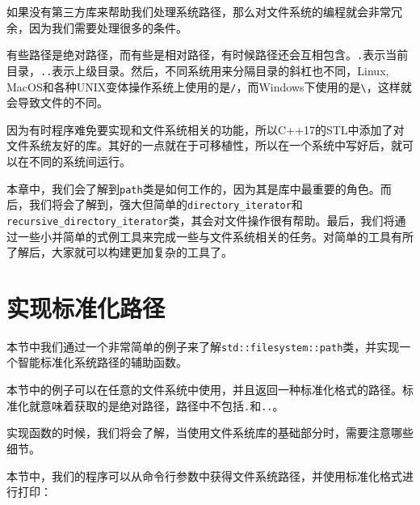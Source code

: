 如果没有第三方库来帮助我们处理系统路径，那么对文件系统的编程就会非常冗余，因为我们需要处理很多的条件。

有些路径是绝对路径，而有些是相对路径，有时候路径还会互相包含。\texttt{.}表示当前目录，\texttt{..}表示上级目录。然后，不同系统用来分隔目录的斜杠也不同，Linux, MacOS和各种UNIX变体操作系统上使用的是\texttt{/}，而Windows下使用的是\texttt{\textbackslash{}}，这样就会导致文件的不同。

因为有时程序难免要实现和文件系统相关的功能，所以C++17的STL中添加了对文件系统友好的库。其好的一点就在于可移植性，所以在一个系统中写好后，就可以在不同的系统间运行。

本章中，我们会了解到\texttt{path}类是如何工作的，因为其是库中最重要的角色。而后，我们将会了解到，强大但简单的\texttt{directory\_iterator}和\texttt{recursive\_directory\_iterator}类，其会对文件操作很有帮助。最后，我们将通过一些小并简单的式例工具来完成一些与文件系统相关的任务。对简单的工具有所了解后，大家就可以构建更加复杂的工具了。


\section{实现标准化路径}

本节中我们通过一个非常简单的例子来了解\texttt{std::filesystem::path}类，并实现一个智能标准化系统路径的辅助函数。

本节中的例子可以在任意的文件系统中使用，并且返回一种标准化格式的路径。标准化就意味着获取的是绝对路径，路径中不包括\texttt{.}和\texttt{..}。

实现函数的时候，我们将会了解，当使用文件系统库的基础部分时，需要注意哪些细节。


本节中，我们的程序可以从命令行参数中获得文件系统路径，并使用标准化格式进行打印：

